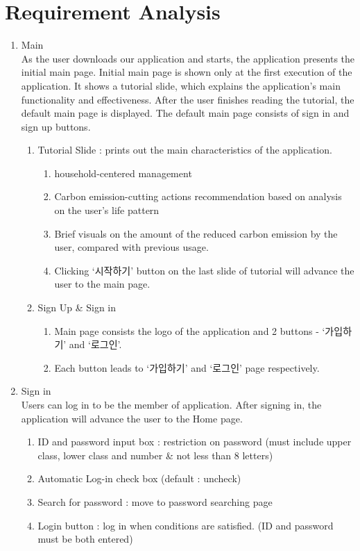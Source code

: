 \documentclass[11pt, conference]{IEEEtran}
\begin{document}
\section{\Large{Requirement Analysis}}
\begin{enumerate}[label=\arabic*]
    \item {\large{Main}}\\
    As the user downloads our application and starts, the application presents the initial main page. Initial main page is shown only at the first execution of the application. It shows a tutorial slide, which explains the application’s main functionality and effectiveness. After the user finishes reading the tutorial, the default main page is displayed. The default main page consists of sign in and sign up buttons.
    \begin{enumerate}[label=\alph*]
        \item Tutorial Slide  : prints out the main characteristics of the application.
            \begin{enumerate}
                \item household-centered management
                \item Carbon emission-cutting actions recommendation based on analysis on the user’s life pattern
                \item Brief visuals on the amount of the reduced carbon emission by the user, compared with previous usage.
                \item Clicking ‘시작하기’ button on the last slide of tutorial will advance the user to the main page.
            \end{enumerate}
        \item Sign Up \& Sign in
            \begin{enumerate}
                \item Main page consists the logo of the application and 2 buttons - ‘가입하기’ and ‘로그인’. 
                \item Each button leads to ‘가입하기’ and ‘로그인’ page respectively.\\
            \end{enumerate}
    \end{enumerate}
    
    \item {\large{Sign in}}\\
    Users can log in to be the member of application. After signing in, the application will advance the user to the Home page.
    \begin{enumerate}[label=\alph*]
        \item ID and password input box : restriction on password (must include upper class, lower class and number \& not less than 8 letters)
        \item Automatic Log-in check box (default : uncheck)
        \item Search for password : move to password searching page
        \item Login button : log in when conditions are satisfied. (ID and password must be both entered)\\
    \end{enumerate}
    

\end{enumerate}
\end{document}

